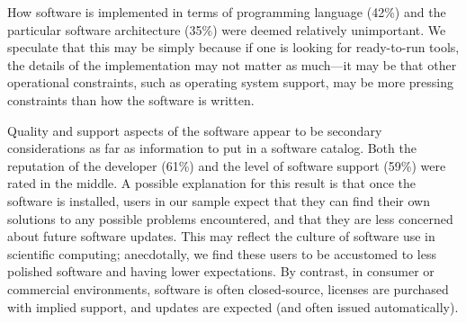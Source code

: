 \documentclass[review]{elsarticle}
\begin{document}
How software is implemented in terms of programming language (42\%) and the particular software architecture (35\%) were deemed relatively unimportant.  We speculate that this may be simply because if one is looking for ready-to-run tools, the details of the implementation may not matter as much---it may be that other operational constraints, such as operating system support, may be more pressing constraints than how the software is written.

Quality and support aspects of the software appear to be secondary considerations as far as information to put in a software catalog.  Both the reputation of the developer (61\%) and the level of software support (59\%) were rated in the middle.  A possible explanation for this result is that once the software is installed, users in our sample expect that they can find their own solutions to any possible problems encountered, and that they are less concerned about future software updates. This may reflect the culture of software use in scientific computing; anecdotally, we find these users to be accustomed to less polished software and having lower expectations.  By contrast, in consumer or commercial environments, software is often closed-source, licenses are purchased with implied support, and updates are expected (and often issued automatically).


\end{document}
